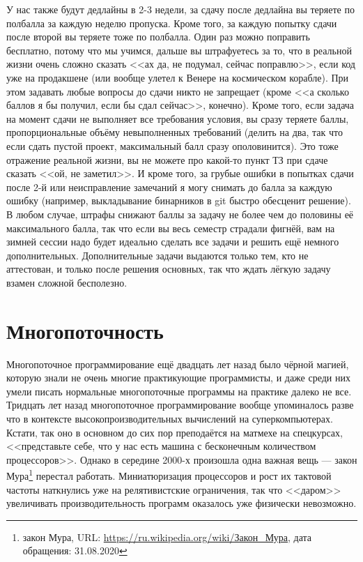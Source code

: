 \documentclass[a5paper]{article}
\begin{document}
У нас также будут дедлайны в 2-3 недели, за сдачу после дедлайна вы теряете по полбалла за каждую неделю пропуска. Кроме того, за каждую попытку сдачи после второй вы теряете тоже по полбалла. Один раз можно поправить бесплатно, потому что мы учимся, дальше вы штрафуетесь за то, что в реальной жизни очень сложно сказать <<ах да, не подумал, сейчас поправлю>>, если код уже на продакшене (или вообще улетел к Венере на космическом корабле). При этом задавать любые вопросы до сдачи никто не запрещает (кроме <<а сколько баллов я бы получил, если бы сдал сейчас>>, конечно). Кроме того, если задача на момент сдачи не выполняет все требования условия, вы сразу теряете баллы, пропорциональные объёму невыполненных требований (делить на два, так что если сдать пустой проект, максимальный балл сразу ополовинится). Это тоже отражение реальной жизни, вы не можете про какой-то пункт ТЗ при сдаче сказать <<ой, не заметил>>. И кроме того, за грубые ошибки в попытках сдачи после 2-й или неисправление замечаний я могу снимать до балла за каждую ошибку (например, выкладывание бинарников в git быстро обесценит решение). В любом случае, штрафы снижают баллы за задачу не более чем до половины её максимального балла, так что если вы весь семестр страдали фигнёй, вам на зимней сессии надо будет идеально сделать все задачи и решить ещё немного дополнительных. Дополнительные задачи выдаются только тем, кто не аттестован, и только после решения основных, так что ждать лёгкую задачу взамен сложной бесполезно.

\section{Многопоточность}

Многопоточное программирование ещё двадцать лет назад было чёрной магией, которую знали не очень многие практикующие программисты, и даже среди них умели писать нормальные многопоточные программы на практике далеко не все. Тридцать лет назад многопоточное программирование вообще упоминалось разве что в контексте высокопроизводительных вычислений на суперкомпьютерах. Кстати, так оно в основном до сих пор преподаётся на матмехе на спецкурсах, <<представьте себе, что у нас есть машина с бесконечным количеством процессоров>>. Однако в середине 2000-х произошла одна важная вещь --- закон Мура\footnote{закон Мура, URL: \url{https://ru.wikipedia.org/wiki/Закон\_Мура}, дата обращения: 31.08.2020} перестал работать. Миниатюризация процессоров и рост их тактовой частоты наткнулись уже на релятивистские ограничения, так что <<даром>> увеличивать производительность программ оказалось уже физически невозможно. 
\end{document}
